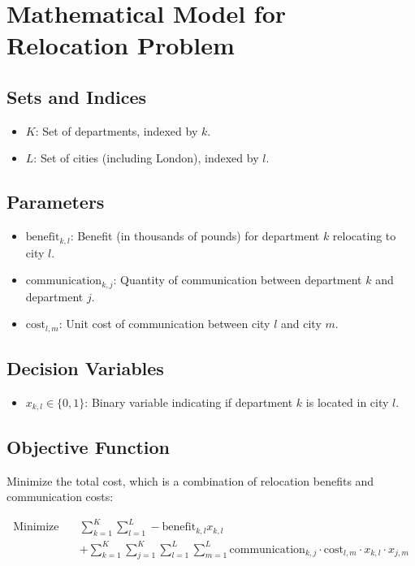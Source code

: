 \documentclass{article}
\begin{document}
\section*{Mathematical Model for Relocation Problem}

\subsection*{Sets and Indices}
\begin{itemize}
    \item $K$: Set of departments, indexed by $k$.
    \item $L$: Set of cities (including London), indexed by $l$.
\end{itemize}

\subsection*{Parameters}
\begin{itemize}
    \item $\text{benefit}_{k, l}$: Benefit (in thousands of pounds) for department $k$ relocating to city $l$.
    \item $\text{communication}_{k, j}$: Quantity of communication between department $k$ and department $j$.
    \item $\text{cost}_{l, m}$: Unit cost of communication between city $l$ and city $m$.
\end{itemize}

\subsection*{Decision Variables}
\begin{itemize}
    \item $x_{k, l} \in \{0, 1\}$: Binary variable indicating if department $k$ is located in city $l$.
\end{itemize}

\subsection*{Objective Function}
Minimize the total cost, which is a combination of relocation benefits and communication costs:

\begin{align*}
\text{Minimize} \quad & \sum_{k=1}^{K} \sum_{l=1}^{L} -\text{benefit}_{k, l} x_{k, l} \\
& + \sum_{k=1}^{K} \sum_{j=1}^{K} \sum_{l=1}^{L} \sum_{m=1}^{L} \text{communication}_{k, j} \cdot \text{cost}_{l, m} \cdot x_{k, l} \cdot x_{j, m}
\end{align*}
\end{document}
